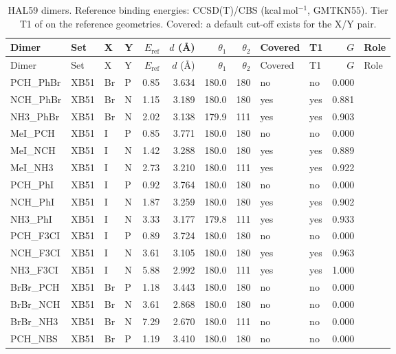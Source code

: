 {\scriptsize
\setlength{\tabcolsep}{3pt}
\begin{longtable}{llllrrrrllrl}
\caption{HAL59 dimers. Reference binding energies: CCSD(T)/CBS (kcal\,mol$^{-1}$, GMTKN55). Tier T1 of \BX{} on the reference geometries. Covered: a default cut-off exists for the X/Y pair.}\label{tab:hal59}\\
\toprule
Dimer & Set & X & Y & $E_\mathrm{ref}$ & $d$ (\AA) & $\theta_1$ & $\theta_2$ & Covered & T1 & $G$ & Role\\
\midrule
\endfirsthead
\toprule
Dimer & Set & X & Y & $E_\mathrm{ref}$ & $d$ (\AA) & $\theta_1$ & $\theta_2$ & Covered & T1 & $G$ & Role\\
\midrule
\endhead
\bottomrule
\endlastfoot
PCH\_PhBr & XB51 & Br & P & 0.85 & 3.634 & 180.0 & 180 & no & no & 0.000 & \\
NCH\_PhBr & XB51 & Br & N & 1.15 & 3.189 & 180.0 & 180 & yes & yes & 0.881 & \\
NH3\_PhBr & XB51 & Br & N & 2.02 & 3.138 & 179.9 & 111 & yes & yes & 0.903 & \\
MeI\_PCH & XB51 & I & P & 0.85 & 3.771 & 180.0 & 180 & no & no & 0.000 & \\
MeI\_NCH & XB51 & I & N & 1.42 & 3.288 & 180.0 & 180 & yes & yes & 0.889 & \\
MeI\_NH3 & XB51 & I & N & 2.73 & 3.210 & 180.0 & 111 & yes & yes & 0.922 & \\
PCH\_PhI & XB51 & I & P & 0.92 & 3.764 & 180.0 & 180 & no & no & 0.000 & \\
NCH\_PhI & XB51 & I & N & 1.87 & 3.259 & 180.0 & 180 & yes & yes & 0.902 & \\
NH3\_PhI & XB51 & I & N & 3.33 & 3.177 & 179.8 & 111 & yes & yes & 0.933 & \\
PCH\_F3CI & XB51 & I & P & 0.89 & 3.724 & 180.0 & 180 & no & no & 0.000 & \\
NCH\_F3CI & XB51 & I & N & 3.61 & 3.105 & 180.0 & 180 & yes & yes & 0.963 & \\
NH3\_F3CI & XB51 & I & N & 5.88 & 2.992 & 180.0 & 111 & yes & yes & 1.000 & \\
BrBr\_PCH & XB51 & Br & P & 1.18 & 3.443 & 180.0 & 180 & no & no & 0.000 & \\
BrBr\_NCH & XB51 & Br & N & 3.61 & 2.868 & 180.0 & 180 & no & no & 0.000 & \\
BrBr\_NH3 & XB51 & Br & N & 7.29 & 2.670 & 180.0 & 111 & no & no & 0.000 & \\
PCH\_NBS & XB51 & Br & P & 1.19 & 3.410 & 180.0 & 180 & no & no & 0.000 & \\

\end{longtable}}
